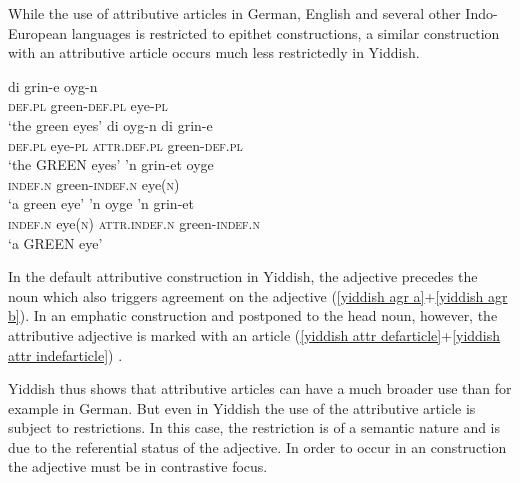 While the use of attributive articles in German, English and several other Indo-European languages is restricted to epithet constructions, a similar construction with an attributive article occurs much less restrictedly in Yiddish.
\begin{exe}
\ex
{}\label{yiddish attr appos}
\begin{xlist}
\ex 
\gll 	di grin-e oyg-n\\
	\textsc{def.pl}	green-\textsc{def.pl} eye-\textsc{pl}\\
\glt	‘the green eyes’\label{yiddish agr a}
\ex
\gll 	di oyg-n di grin-e\\
	\textsc{def.pl} eye-\textsc{pl} \textsc{attr.def.pl} green-\textsc{def.pl}\\
\glt	‘the GREEN eyes’\label{yiddish attr defarticle}
\ex	
\gll	'n grin-et oyge\\
	\textsc{indef.n} green-\textsc{indef.n} eye(\textsc{n})\\
\glt	‘a green eye’\label{yiddish agr b}
\ex	
\gll	'n oyge 'n grin-et\\
	\textsc{indef.n} eye(\textsc{n}) \textsc{attr.indef.n} green-\textsc{indef.n}\\
\glt	‘a GREEN eye’\label{yiddish attr indefarticle}
\end{xlist}
\end{exe}
In the default attributive construction in Yiddish, the adjective precedes the noun which also triggers agreement on the adjective (\ref{yiddish agr a}+\ref{yiddish agr b}). In an emphatic construction and postponed to the head noun, however, the attributive adjective is marked with an article (\ref{yiddish attr defarticle}+\ref{yiddish attr indefarticle}) \citep[342–347]{plank2003}.

Yiddish thus shows that attributive articles can have a much broader use than for example in German. But even in Yiddish the use of the attributive article is subject to restrictions. In this case, the restriction is of a semantic nature and is due to the referential status of the adjective. In order to occur in an  construction the adjective must be in contrastive focus.

